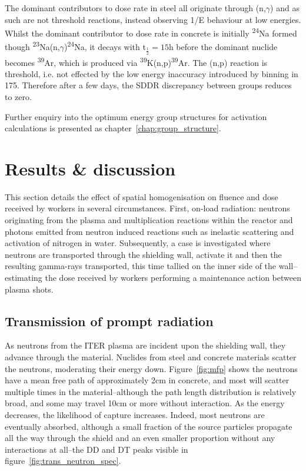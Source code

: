 The dominant contributors to dose rate in steel all originate through (n,$\gamma$) and as such are not threshold reactions, instead observing 1/E behaviour at low energies. Whilst the dominant contributor to dose rate in concrete is initially \textsuperscript{24}Na formed though \textsuperscript{23}Na(n,$\gamma$)\textsuperscript{24}Na, it decays with t$_{\frac{1}{2}}=15$h before the dominant nuclide becomes \textsuperscript{39}Ar, which is produced via \textsuperscript{39}K(n,p)\textsuperscript{39}Ar. The (n,p) reaction is threshold, i.e. not effected by the low energy inaccuracy introduced by binning in 175. Therefore after a few days, the SDDR discrepancy between groups reduces to zero.

Further enquiry into the optimum energy group structures for activation calculations is presented as chapter~\ref{chap:group_structure}.

\section{Results \& discussion}
This section details the effect of spatial homogenisation on fluence and dose received by workers in several circumstances. First, on-load radiation: neutrons originating from the plasma and multiplication reactions within the reactor and photons emitted from neutron induced reactions such as inelastic scattering and activation of nitrogen in water. Subsequently, a case is investigated where neutrons are transported through the shielding wall, activate it and then the resulting gamma-rays transported, this time tallied on the inner side of the wall--estimating the dose received by workers performing a maintenance action between plasma shots.

\subsection{Transmission of prompt radiation}
\label{subsec:prompt}
As neutrons from the ITER plasma are incident upon the shielding wall, they advance through the material. Nuclides from steel and concrete materials scatter the neutrons, moderating their energy down. Figure~\ref{fig:mfp} shows the neutrons have a mean free path of approximately 2cm in concrete, and most will scatter multiple times in the material--although the path length distribution is relatively broad, and some may travel 10cm or more without interaction. As the energy decreases, the likelihood of capture increases. Indeed, most neutrons are eventually absorbed, although a small fraction of the source particles propagate all the way through the shield and an even smaller proportion without any interactions at all--the DD and DT peaks visible in figure~\ref{fig:trans_neutron_spec}. 

